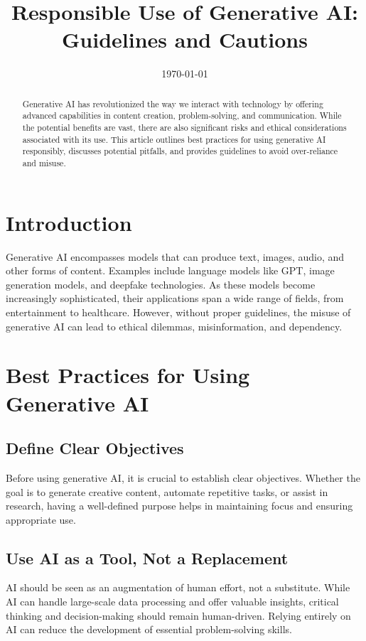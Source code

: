 \documentclass{article}
\title{Responsible Use of Generative AI: Guidelines and Cautions}
\date{\today}
\begin{document}
\maketitle

\begin{abstract}
Generative AI has revolutionized the way we interact with technology by offering advanced capabilities in content creation, problem-solving, and communication. While the potential benefits are vast, there are also significant risks and ethical considerations associated with its use. This article outlines best practices for using generative AI responsibly, discusses potential pitfalls, and provides guidelines to avoid over-reliance and misuse.
\end{abstract}

\section{Introduction}
Generative AI encompasses models that can produce text, images, audio, and other forms of content. Examples include language models like GPT, image generation models, and deepfake technologies. As these models become increasingly sophisticated, their applications span a wide range of fields, from entertainment to healthcare. However, without proper guidelines, the misuse of generative AI can lead to ethical dilemmas, misinformation, and dependency.

\section{Best Practices for Using Generative AI}

\subsection{Define Clear Objectives}
Before using generative AI, it is crucial to establish clear objectives. Whether the goal is to generate creative content, automate repetitive tasks, or assist in research, having a well-defined purpose helps in maintaining focus and ensuring appropriate use.

\subsection{Use AI as a Tool, Not a Replacement}
AI should be seen as an augmentation of human effort, not a substitute. While AI can handle large-scale data processing and offer valuable insights, critical thinking and decision-making should remain human-driven. Relying entirely on AI can reduce the development of essential problem-solving skills.
\end{document}
